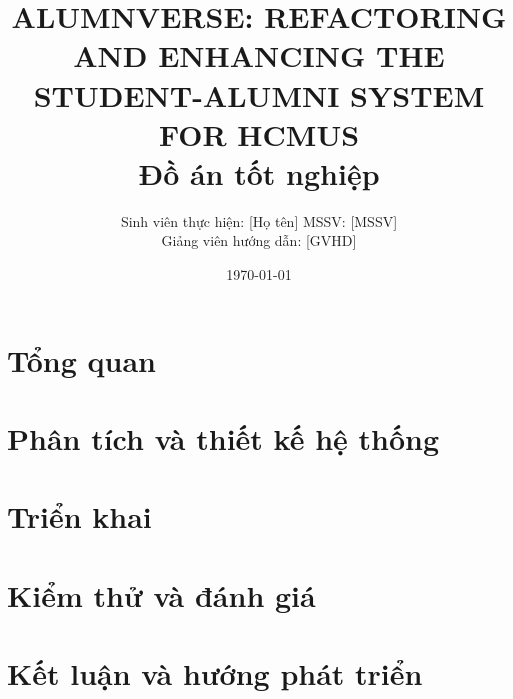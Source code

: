 \documentclass[12pt,a4paper]{report}
\title{
    \textbf{ALUMNVERSE: REFACTORING AND ENHANCING THE STUDENT-ALUMNI SYSTEM FOR HCMUS}\\[0.5em]
    \large Đồ án tốt nghiệp
}
\author{
    Sinh viên thực hiện: [Họ tên] \quad MSSV: [MSSV]\\[0.5em]
    Giảng viên hướng dẫn: [GVHD]
}
\date{\today}
\begin{document}
\maketitle

\setcounter{page}{2}


\clearpage


\clearpage

\tableofcontents
\clearpage

\listoffigures
{}
\clearpage

\listoftables
{}
\clearpage

\setcounter{page}{1}

\chapter{Tổng quan}


\chapter{Phân tích và thiết kế hệ thống}


\chapter{Triển khai}


\chapter{Kiểm thử và đánh giá}


\chapter{Kết luận và hướng phát triển}





\appendix

\end{document}
